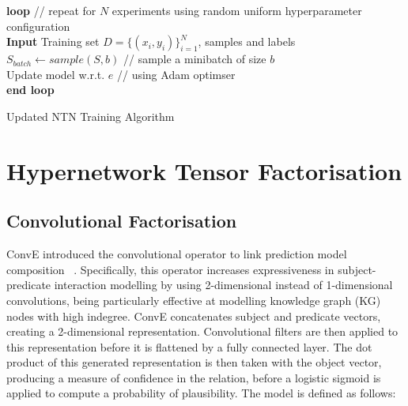 \medskip

\begin{algorithm}[H]
	\textbf{loop} // repeat for $N$ experiments using random uniform hyperparameter configuration \\
		\SetAlgoLined
		\textbf{Input} 
		Training set \begin{math} D = \{(x_i, y_i)\}_{i=1}^N \end{math}, samples and labels\;
  		\begin{math} S_{batch} \gets sample(S, b) \end{math} // sample a minibatch of size \begin{math} b \end{math} \\
		Update model w.r.t. \begin{math}  e \end{math} // using Adam optimser \\
	\textbf{end loop}
	\caption{Updated NTN Training Algorithm}
\end{algorithm} 



\section{Hypernetwork Tensor Factorisation}

\subsection{Convolutional Factorisation}
ConvE introduced the convolutional operator to link prediction model composition ~\citep{dettmers2018convolutional}. Specifically, this operator increases expressiveness in subject-predicate interaction modelling by using 2-dimensional instead of 1-dimensional convolutions, being particularly effective at modelling knowledge graph (KG) nodes with high indegree. ConvE concatenates subject and predicate vectors, creating a 2-dimensional representation. Convolutional filters are then applied to this representation before it is flattened by a fully connected layer. The dot product of this generated representation is then taken with the object vector, producing a measure of confidence in the relation, before a logistic sigmoid is applied to compute a probability of plausibility. The model is defined as follows:

